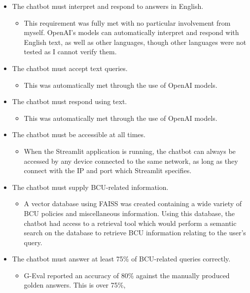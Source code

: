 \begin{itemize}
    \item The chatbot must interpret and respond to answers in English.
    \begin{itemize}
        \item This requirement was fully met with no particular involvement from myself. OpenAI's models can automatically 
        interpret and respond with English text, as well as other languages, though other languages were not tested as I 
        cannot verify them. 
    \end{itemize}
    \item The chatbot must accept text queries.
    \begin{itemize}
        \item This was automatically met through the use of OpenAI models.
    \end{itemize}
    \item The chatbot must respond using text.
    \begin{itemize}
        \item This was automatically met through the use of OpenAI models.
    \end{itemize}
    \item The chatbot must be accessible at all times.
    \begin{itemize}
        \item When the Streamlit application is running, the chatbot can always be accessed 
        by any device connected to the same network, as long as they connect with the IP and port
        which Streamlit specifies.
    \end{itemize}
    \item The chatbot must supply BCU-related information.
    \begin{itemize}
        \item A vector database using FAISS was created containing a wide variety of BCU policies and miscellaneous
        information. Using this database, the chatbot had access to a retrieval tool which would perform a semantic 
        search on the database to retrieve BCU information relating to the user's query.
    \end{itemize}
    \item The chatbot must answer at least 75\% of BCU-related queries correctly.
    \begin{itemize}
        \item G-Eval reported an accuracy of 80\% against the manually produced golden answers. This is over 75\%,

\end{itemize}
\end{itemize}

